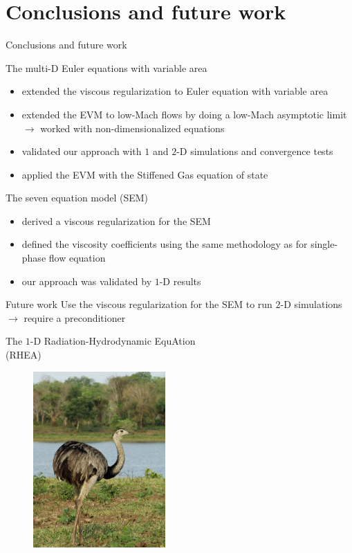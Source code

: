 \documentclass[xcolor=dvipsnames,10pt]{beamer}
\begin{document}
\section{Conclusions and future work}
\begin{frame}{Conclusions and future work}
\begin{block}{The multi-D Euler equations with variable area}
\begin{itemize}
\item extended the viscous regularization to Euler equation with variable area
\item extended the EVM to low-Mach flows by doing a low-Mach asymptotic limit $\rightarrow$ worked with non-dimensionalized equations
\item validated our approach with $1$ and $2$-D simulations and convergence tests
\item applied the EVM with the Stiffened Gas equation of state
\end{itemize}
\end{block}
\begin{block}{The seven equation model (SEM)}
\begin{itemize}
\item derived a viscous regularization for the SEM
\item defined the viscosity coefficients using the same methodology as for single-phase flow equation
\item our approach was validated by $1$-D results
\end{itemize}
\end{block}
\begin{block}{Future work}
Use the viscous regularization for the SEM to run $2$-D simulations $\to$ require a preconditioner
\end{block}
\end{frame}
\begin{frame}{}
\begin{center}
The $1$-D Radiation-Hydrodynamic EquAtion \\
(RHEA)
\end{center}
\begin{figure}[H]
\centering
\includegraphics[width=0.45\textwidth]{../figures/rhea.png}
\end{figure}
\end{frame}
\end{document}
